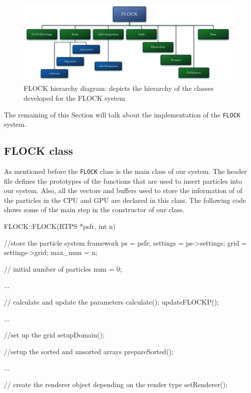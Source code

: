 \begin{figure}[htbp]
\begin{center}
\includegraphics[scale=0.3]{figures/FLOCKdiagram.pdf}
\caption{FLOCK hierarchy diagram: depicts the hierarchy of the classes developed for the FLOCK system}
\label{flockdiagram}
\end{center}
\end{figure}


The remaining of this Section will talk about the implementation of the \texttt{FLOCK} system.

\subsection{FLOCK class}
As mentioned before the \texttt{FLOCK} class is the main class of our system. The header file defines the prototypes of the functions that are used to insert particles into our system. Also, all the vectors and buffers used to store the information of of the particles in the CPU and GPU are declared in this class. The following code shows some of the main step in the constructor of our class.

\begin{cppcode}{0}
FLOCK::FLOCK(RTPS *psfr, int n)
 {
 	//store the particle system framework
 	ps = psfr;
	settings = ps->settings;
	grid = settings->grid;
	max_num = n;
	
	// initial number of particles
	num = 0;
 	
	...
 
 	// calculate and update the parameters
	calculate();
	updateFLOCKP();

	...

	//set up the grid
	setupDomain();
	
	//setup the sorted and unsorted arrays
	prepareSorted();
 	 
	 ...
		
	// create the renderer object depending on the render type		
	setRenderer(); 
}
\end{cppcode}

